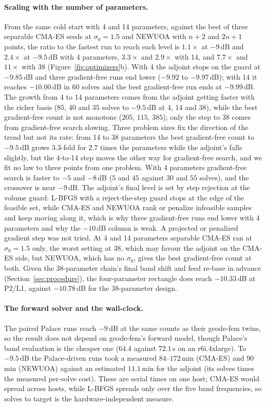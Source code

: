 \documentclass{anvil-paper}
\newcommand{\PL}{P2/L1}
\begin{document}
\paragraph{Scaling with the number of parameters.}
From the same cold start with 4 and 14 parameters, against the best of three
separable CMA-ES seeds at $\sigma_0 = 1.5$ and NEWUOA with $n + 2$ and
$2n + 1$ points, the ratio to the fastest run to reach each level is
$1.1\times$ at $-9$\,dB and $2.4\times$ at $-9.5$\,dB with 4 parameters,
$3.3\times$ and $2.9\times$ with 14, and $7.7\times$ and $11\times$ with 38 (Figure~\ref{fig:optimizers}b). With 4 the adjoint stops on the guard
at $-9.85$\,dB and three gradient-free runs end lower ($-9.92$ to
$-9.97$\,dB); with 14 it reaches $-10.00$\,dB in $60$ solves and the best
gradient-free run ends at $-9.99$\,dB. The growth from 4 to 14 parameters
comes from the adjoint getting faster with the richer basis ($85$, $40$ and
$35$ solves to $-9.5$\,dB at 4, 14 and 38), while the best gradient-free
count is not monotone ($205$, $115$, $385$); only the step to 38 comes from
gradient-free search slowing. Three problem sizes fix the direction of the
trend but not its rate: from 14 to 38 parameters the best gradient-free count
to $-9.5$\,dB grows $3.3$-fold for $2.7$ times the parameters while the
adjoint's falls slightly, but the 4-to-14 step moves the other way for
gradient-free search, and we fit no law to three points from one problem. With 4 parameters gradient-free search is
faster to $-5$ and $-8$\,dB ($5$ and $45$ against $30$ and $55$ solves), and
the crossover is near $-9$\,dB. The adjoint's final level is set by step
rejection at the volume guard: L-BFGS with a reject-the-step guard stops at
the edge of the feasible set, while CMA-ES and NEWUOA rank or penalize
infeasible samples and keep moving along it, which is why three
gradient-free runs end lower with 4 parameters and why the $-10$\,dB column
is weak. A projected or penalized gradient step was not tried. At 4 and 14 parameters separable
CMA-ES ran at $\sigma_0 = 1.5$ only, the worst setting at 38, which may
favour the adjoint on the CMA-ES side, but NEWUOA, which has no $\sigma_0$,
gives the best gradient-free count at both. Given the 38-parameter chain's final band
shift and feed re-base in advance (Section~\ref{sec:procedure}), the
four-parameter rectangle does reach $-10.33$\,dB at \PL{}, against
$-10.78$\,dB for the 38-parameter design.

\paragraph{The forward solver and the wall-clock.}
The paired Palace runs reach $-9$\,dB at the same counts as their geode-fem
twins, so the result does not depend on geode-fem's forward model, though
Palace's band evaluation is the cheaper one ($64.4$ against $72.1$\,s on an
r6i.4xlarge). To $-9.5$\,dB the Palace-driven runs took a measured
$84$--$172$\,min (CMA-ES) and $90$\,min (NEWUOA) against an estimated
$11.1$\,min for the adjoint (its solves times the measured per-solve cost). These
are serial times on one host; CMA-ES would spread across hosts, while L-BFGS
spreads only over the five band frequencies, so solves to target is the
hardware-independent measure.
\end{document}
